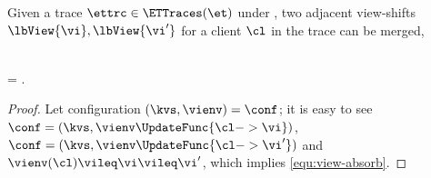 \begin{toappendix}
\begin{lemma}
\label{lem:view-shift-absorb}
Given a trace \( \ettrc \in \ETTraces(\et) \) under \et,
two adjacent view-shifts \( \lbView{\vi},\lbView{\vi'} \) for a client \( \cl \) in the trace can be merged,
\begin{Formulae}
\begin{Formula}
    \\ \ettrc = 
    \implies  {}.
    \label{equ:view-absorb}
\end{Formula}
\end{Formulae}
\end{lemma}
\begin{proof}
Let configuration \( (\kvs, \vienv ) = \conf \);
it is easy to see \( \conf = (\kvs, \vienv\UpdateFunc{\cl -> \vi})\), \( \conf = (\kvs, \vienv\UpdateFunc{\cl -> \vi'}) \)
and \( \vienv(\cl) \vileq \vi \vileq \vi' \), which implies \cref{equ:view-absorb}.
\end{proof}
\end{toappendix}

